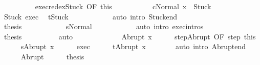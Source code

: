 \begin{isabellebody}
\ \ \ \ \ \ \ \ \isamarkupfalse%
\ exec{\isacharunderscore}redex{\isacharunderscore}Stuck\ {\isacharbrackleft}OF\ this{\isacharbrackright}\isanewline
\ \ \ \ \ \ \ \ \isamarkupfalse%
\ {\isachardoublequoteopen}{\isasymGamma}{\isasymturnstile}\ {\isasymlangle}cNormal\ x{\isasymrangle}\ {\isasymRightarrow}\ Stuck{\isachardoublequoteclose}\isacommand{{\isachardot}}\isamarkupfalse%
\isanewline
\ \ \ \ \ \ \ \ \isamarkupfalse%
\ \isamarkupfalse%
\ Stuck\ exec{\isacharprime}\ \isamarkupfalse%
\ {\isachardoublequoteopen}t{\isacharequal}Stuck{\isachardoublequoteclose}\isanewline
\ \ \ \ \ \ \ \ \ \ \isamarkupfalse%
\ {\isacharparenleft}auto\ intro{\isacharcolon}\ Stuck{\isacharunderscore}end{\isacharparenright}\isanewline
\ \ \ \ \ \ \ \ \isamarkupfalse%
\isanewline
\ \ \ \ \ \ \ \ \isamarkupfalse%
\ {\isacharquery}thesis\isanewline
\ \ \ \ \ \ \ \ \ \ \isamarkupfalse%
\ s{\isacharunderscore}Normal\isanewline
\ \ \ \ \ \ \ \ \ \ \isamarkupfalse%
\ {\isacharparenleft}auto\ intro{\isacharcolon}\ exec{\isachardot}intros{\isacharparenright}\isanewline
\ \ \ \ \ \ \isacommand{{\isacharbraceright}}\isamarkupfalse%
\isanewline
\ \ \ \ \ \ \isamarkupfalse%
\ \isamarkupfalse%
\ {\isacharquery}thesis\isanewline
\ \ \ \ \ \ \ \ \isamarkupfalse%
\ auto\isanewline
\ \ \ \ \isamarkupfalse%
\isanewline
\ \ \isamarkupfalse%
\isanewline
\ \ \ \ \isamarkupfalse%
\ {\isacharparenleft}Abrupt\ x{\isacharparenright}\isanewline
\ \ \ \ \isamarkupfalse%
\ step{\isacharunderscore}Abrupt\ {\isacharbrackleft}OF\ step\ this{\isacharbrackright}\isanewline
\ \ \ \ \isamarkupfalse%
\ {\isachardoublequoteopen}s{\isacharprime}{\isacharequal}Abrupt\ x{\isachardoublequoteclose}\isacommand{{\isachardot}}\isamarkupfalse%
\isanewline
\ \ \ \ \isamarkupfalse%
\ exec{\isacharprime}\isanewline
\ \ \ \ \isamarkupfalse%
\ {\isachardoublequoteopen}t{\isacharequal}Abrupt\ x{\isachardoublequoteclose}\isanewline
\ \ \ \ \ \ \isamarkupfalse%
\ {\isacharparenleft}auto\ intro{\isacharcolon}\ Abrupt{\isacharunderscore}end{\isacharparenright}\isanewline
\ \ \ \ \isamarkupfalse%
\ Abrupt\isanewline
\ \ \ \ \isamarkupfalse%
\ {\isacharquery}thesis\isanewline
\ \ \ \ \ \ \isamarkupfalse%

\end{isabellebody}
